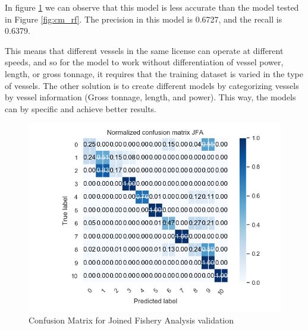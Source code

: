 In figure \ref{fig:val_jfa} we can observe that this model is less accurate than the model tested in Figure \ref{fig:cm_rf}. 
The precision in this model is 0.6727, and the recall is 0.6379.

This means that different vessels in the same license can operate at different speeds, and so for the model to work without differentiation of vessel power, length, or gross tonnage, it requires that the training dataset is varied in the type of vessels.
The other solution is to create different models by categorizing vessels by vessel information (Gross tonnage, length, and power). This way, the models can by specific and achieve better results. 

\begin{figure}[H]
\centering
\includegraphics[width=0.8\linewidth]{Chapters/img/val_JFA.png}
\caption{Confusion Matrix for Joined Fishery Analysis validation }
\label{fig:val_jfa}
\end{figure}





